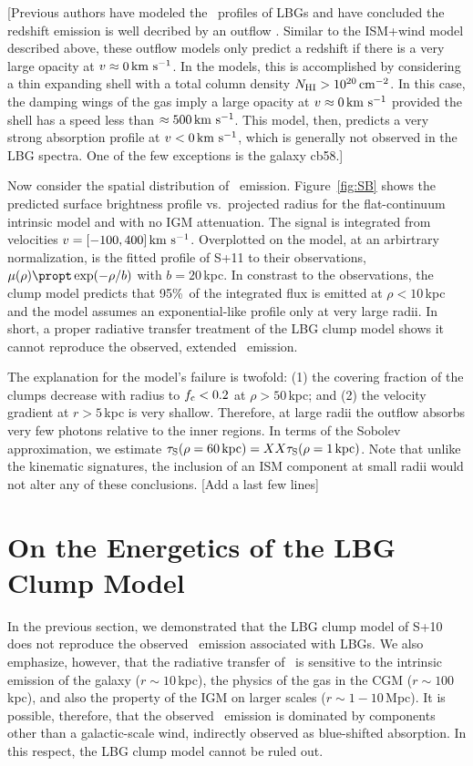 \documentclass[12pt,preprint]{aastex}
\begin{document}
[Previous authors have modeled the \lya\ profiles of LBGs and have
concluded the redshift emission is well decribed by an outflow
\citep[e.g.][]{verhomme}.  Similar to the
ISM+wind model described above, these outflow models only predict a
redshift if there is a very large opacity at $v \approx 0\, {\rm km~s^{-1}}$.  In
the \cite{verhomme} models, this is accomplished by considering a
thin expanding shell with a total  column density $N_{\rm HI} > 10^{20}
\, {\rm cm^{-2}}$.  In this case, the damping wings of the gas imply a large
opacity at $v \approx 0 \, {\rm km~s^{-1}}$ provided the shell has a speed less
than $\approx 500 \, {\rm km~s^{-1}}$.  This model, then, predicts a very strong
absorption profile at $v < 0 \, {\rm km~s^{-1}}$, which is generally not observed
in the LBG spectra.  One of the few exceptions is the galaxy cb58.]

Now consider the spatial distribution of \lya\ emission.
Figure~\ref{fig:SB} shows the predicted surface brightness profile
vs.\ projected radius for the flat-continuum intrinsic model and with
no IGM attenuation.  The signal is integrated from velocities $v =
[-100,400]\, {\rm km~s^{-1}}$. Overplotted on the model, at an arbirtrary
normalization, is the fitted profile of S+11 to their observations,
$\mu(\rho) \propt \exp(-\rho/b)$ with $b=20$\,kpc.  In constrast to
the observations, the clump model predicts that 95\%\ of the
integrated flux is emitted at $\rho < 10$\,kpc and the model assumes
an exponential-like profile only at very large radii.  In short, a
proper radiative transfer treatment of the LBG clump model shows it
cannot reproduce the observed, extended \lya\ emission.  

The explanation for the model's failure is twofold:  
(1) the covering fraction of the clumps decrease with radius to
$f_{\rm c} < 0.2$ at $\rho > 50$\,kpc; and
(2) the velocity gradient at $r>5$\,kpc is very shallow.  Therefore,
at large radii the outflow absorbs very few photons relative to the
inner regions.  In terms of the Sobolev approximation, we estimate
$\tau_{\rm S}(\rho = 60 \, {\rm kpc}) = XX \tau_{\rm S}(\rho=1\, {\rm
  kpc})$.  
Note that unlike the kinematic signatures, the inclusion of an ISM
component at small radii would not alter any of these conclusions.
[Add a last few lines]


\section{On the Energetics of the LBG Clump Model}
\label{sec:energy}

In the previous section, we demonstrated that the LBG clump model
of S+10 does not reproduce the observed \lya\ emission associated with
LBGs.   We also emphasize, however, that the radiative transfer of
\lya\ is sensitive to the intrinsic emission of the galaxy ($r \sim
10$\,kpc), the physics of the gas in the CGM ($r \sim 100$\,kpc), and
also the property of the IGM on larger scales ($r \sim 1-10$\,Mpc).
It is possible, therefore, that the observed \lya\ emission is
dominated by components other than a galactic-scale wind, indirectly
observed as blue-shifted absorption.  In this respect, the LBG clump
model cannot be ruled out.
\end{document}
